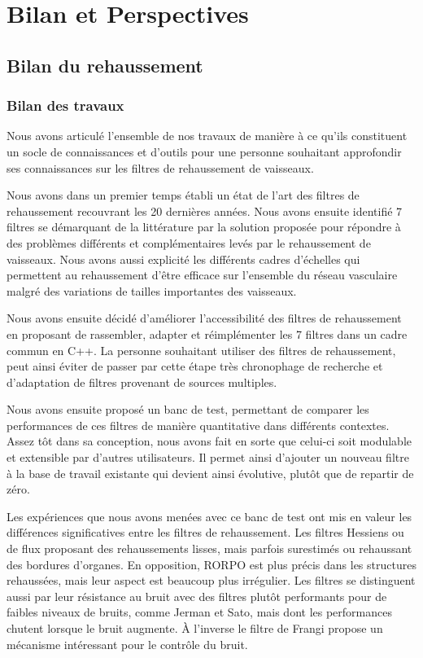 \chapter{Bilan et Perspectives}

\section{Bilan du rehaussement}


\subsection{ Bilan des travaux}

Nous avons articulé l'ensemble de nos travaux de manière à ce qu'ils constituent un socle de connaissances et d'outils pour une personne souhaitant approfondir ses connaissances sur les filtres de rehaussement de vaisseaux. 

Nous avons dans un premier temps établi un état de l'art des filtres de rehaussement recouvrant les 20 dernières années. Nous avons ensuite identifié 7 filtres se démarquant de la littérature par la solution proposée pour répondre à des problèmes différents et complémentaires levés par le rehaussement de vaisseaux. Nous avons aussi explicité les différents cadres d'échelles qui permettent au rehaussement d'être efficace sur l'ensemble du réseau vasculaire malgré des variations de tailles importantes des vaisseaux.

Nous avons ensuite décidé d'améliorer l'accessibilité des filtres de rehaussement en proposant de rassembler, adapter et réimplémenter les 7 filtres dans un cadre commun en C++. La personne souhaitant utiliser des filtres de rehaussement, peut ainsi éviter de passer par cette étape très chronophage de recherche et d'adaptation de filtres provenant de sources multiples. 

Nous avons ensuite proposé un banc de test, permettant de comparer les performances de ces filtres de manière quantitative dans différents contextes. Assez tôt dans sa conception, nous avons fait en sorte que celui-ci soit modulable et extensible par d'autres utilisateurs. Il permet ainsi d'ajouter un nouveau filtre à la base de travail existante qui devient ainsi évolutive, plutôt que de repartir de zéro.

Les expériences que nous avons menées avec ce banc de test ont mis en valeur les différences significatives entre les filtres de rehaussement. Les filtres Hessiens ou de flux proposant des rehaussements lisses, mais parfois surestimés ou rehaussant des bordures d'organes. En opposition, RORPO est plus précis dans les structures rehaussées, mais leur aspect est beaucoup plus irrégulier. Les filtres se distinguent aussi par leur résistance au bruit avec des filtres plutôt performants pour de faibles niveaux de bruits, comme Jerman et Sato, mais dont les performances chutent lorsque le bruit augmente. À l'inverse le filtre de Frangi propose un mécanisme intéressant pour le contrôle du bruit.

